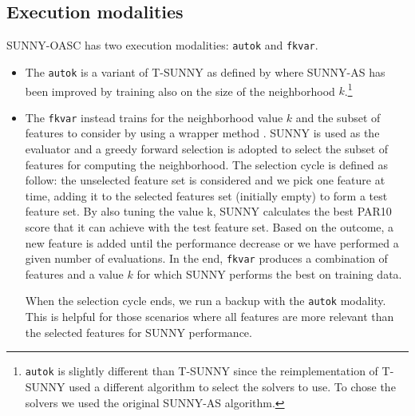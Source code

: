 \documentclass[tablecaption=bottom,wcp]{jmlr} %
\begin{document}


\subsection{Execution modalities}

SUNNY-OASC has two execution modalities: \texttt{autok} and 
\texttt{fkvar}. 

\begin{itemize}
  \item The \texttt{autok} is a variant of T-SUNNY as defined by 
\cite{DBLP:conf/lion/LindauerBH16} where SUNNY-AS has been improved by training 
also on the size of the neighborhood 
$k$.\footnote{\texttt{autok} is slightly different than T-SUNNY since the 
reimplementation of T-SUNNY used a different algorithm to select the 
solvers to use. To chose the solvers we used the original SUNNY-AS 
algorithm.}
  \item The \texttt{fkvar} instead trains for the neighborhood value $k$ and 
the subset of features to consider by using a wrapper method 
\cite{Kohavi97wrappersfor}. SUNNY is used as the evaluator and a 
greedy forward selection is adopted to select the subset of features for 
computing the neighborhood.
% 
The selection cycle is defined as follow: 
the unselected feature set is considered and we pick one feature at time, 
adding it to the selected features set (initially empty) to form a test 
feature set. By also tuning the value k, SUNNY calculates the best PAR10 score 
that it can achieve with the test feature set. Based on the outcome, a new 
feature is added until the performance decrease or we have performed a given 
number of evaluations. In the end, \texttt{fkvar} 
produces a combination of features and a value $k$ for which SUNNY performs the 
best on training data.

When the selection cycle ends, we run a backup with the \texttt{autok} modality. This is helpful
for those scenarios where all features are more relevant than the selected features
for SUNNY performance.
\end{itemize}
 
\end{document}
